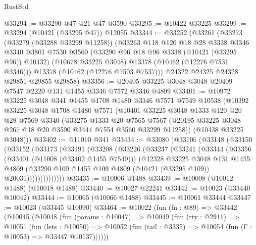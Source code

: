 \begin{lexlean}{RustStd}
\begin{coremodule}
@33294 := @33290 @47 @21 @47 @3590
@33295 := @10422 @33225
@33299 := @33294 (@10421 (@33295 @47)) @12055
@33344 := @33252
    (@33261
      (@33273
        (@33279 (@33288 @33299 @11258))
        (@33263
          @118
          @120
          @18
          @28
          @3338
          @3346
          @3340
          @3801
          @7530
          @3560
          (@33290 @96 @18 @96 @3338 (@10421 (@33295 @96)) @10432)
          (@10678 @33225 @3048)
          @13378
          (@10462 (@12276 @7531 @3346)))
        @13378
        (@10462 (@12276 @7503 @7537)))
      @24322
      @24325
      @24328
      @29851
      @29855
      @29858)
@33356 := @20405 @33225 @3048 @3048 @20409 @7547 @2220 @131 @1455 @3346 @7572 @3346 @4809
@33401 := @10972
    @33225
    @3048
    @341
    @1455
    @1708
    @1480
    @3346
    @7571
    @7549
    @10538
    (@10392
      @33225
      @3048
      @1708
      @1480
      @7571
      (@10401
        @33225
        @3048
        @1333
        @120
        @20
        @28
        @7569
        @3340
        (@33275
          @1333
          @20
          @7565
          @7567
          (@20195 @33225 @3048 @267 @18 @20 @3590 @3444 @7554 @3560 @33299 @11258))
        (@10438 @33225 @3048)))
@33402 := @11010 @341
@33434 := @33080
    (@33106
      (@33148
        (@33150
          (@33152
            (@33173
              (@33191
                (@33208
                  (@33226
                    (@33237
                      (@33241
                        (@33344
                          (@33356
                            (@33401 (@11008 (@33402 @1455 @7549)))
                            (@12328
                              @33225
                              @3048
                              @131
                              @1455
                              @4809
                              (@33290
                                @109
                                @1455
                                @109
                                @4809
                                (@10421 (@33295 @109))
                                @20031))))))))))))))
@33435 := @10006 @1488
@33439 := @10008 (@10012 @1488) (@10018 @1488)
@33440 := @10027 @22241
@33442 := @10023 (@33440 @10042)
@33444 := @10065 (@10066 @1488)
@33445 := @10061 @33444
@33447 := @10023 (@33445 @10090)
@33464 := @10022
    (fun (fn : @89) =>
    @33442
      (@10045
        (@10048
          (fun (params : @10047) =>
          @10049
            (fun (rty : @2911) =>
            @10051
              (fun (lets : @10050) =>
              @10052 (fun (tail : @3335) => @10054 (fun (Γ : @10053) => @33447 @10137))))))

\end{coremodule}
\end{lexlean}
